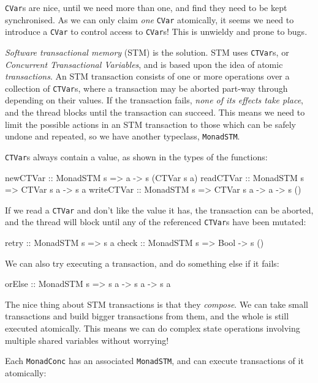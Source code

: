 \verb|CVar|s are nice, until we need more than one, and find they need
to be kept synchronised. As we can only claim \emph{one} \verb|CVar|
atomically, it seems we need to introduce a \verb|CVar| to control
access to \verb|CVar|s! This is unwieldy and prone to bugs.

\emph{Software transactional memory} (STM) is the solution. STM uses
\verb|CTVar|s, or \emph{Concurrent Transactional Variables}, and is
based upon the idea of atomic \emph{transactions}. An STM transaction
consists of one or more operations over a collection of \verb|CTVar|s,
where a transaction may be aborted part-way through depending on their
values. If the transaction fails, \emph{none of its effects take
  place}, and the thread blocks until the transaction can
succeed. This means we need to limit the possible actions in an STM
transaction to those which can be safely undone and repeated, so we
have another typeclass, \verb|MonadSTM|.

\verb|CTVar|s always contain a value, as shown in the types of the
functions:

\begin{haskellcode}
newCTVar   :: MonadSTM s => a -> s (CTVar s a)
readCTVar  :: MonadSTM s => CTVar s a -> s a
writeCTVar :: MonadSTM s => CTVar s a -> a -> s ()
\end{haskellcode}

If we read a \verb|CTVar| and don't like the value it has, the
transaction can be aborted, and the thread will block until any of the
referenced \verb|CTVar|s have been mutated:

\begin{haskellcode}
retry :: MonadSTM s => s a
check :: MonadSTM s => Bool -> s ()
\end{haskellcode}

We can also try executing a transaction, and do something else if it
fails:

\begin{haskellcode}
orElse :: MonadSTM s => s a -> s a -> s a
\end{haskellcode}

The nice thing about STM transactions is that they \emph{compose}. We
can take small transactions and build bigger transactions from them,
and the whole is still executed atomically. This means we can do
complex state operations involving multiple shared variables without
worrying!

Each \verb|MonadConc| has an associated \verb|MonadSTM|, and can
execute transactions of it atomically:

